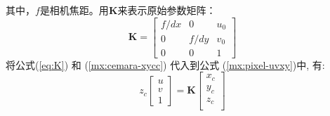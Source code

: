 其中，$f$是相机焦距。用$\mathbf{K}$来表示原始参数矩阵：
\begin{equation}\label{eq:K}
        \mathbf{K}=\begin{bmatrix}
          f/dx & 0 &u_{0} \\
           0& f/dy &v_{0} \\
           0& 0 &1
         \end{bmatrix}
\end{equation}
 将公式(\ref{eq:K}) 和 (\ref{mx:cemara-xycc}) 代入到公式 (\ref{mx:pixel-uvxy})中, 有:
\begin{equation}\label{mx:uvxcyczc}
        z_{c}\begin{bmatrix}
          u\\
          v\\
         1
         \end{bmatrix}
         =\mathbf{K}
         \begin{bmatrix}
          x_{c}\\
          y_{c}\\
         z_{c}\\
         \end{bmatrix}
\end{equation}


